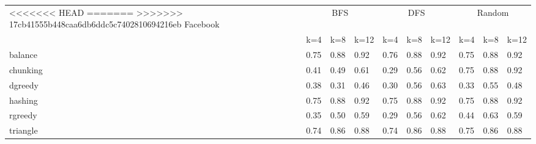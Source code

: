 \documentclass[12pt]{article}
\begin{document}
\begin{tabular}{llllllllll}
<<<<<<< HEAD
\toprule
=======
\toprule
>>>>>>> 17cb41555b448caa6db6ddc5c7402810694216eb
    Facebook & \multicolumn{3}{c}{BFS} & \multicolumn{3}{c}{DFS} & \multicolumn{3}{c}{Random}\\

    & k=4 & k=8 & k=12
    & k=4 & k=8 & k=12
     & k=4 & k=8 & k=12  \\
    \midrule
    balance &  0.75 & 0.88 	& 0.92 	& 0.76 	 &0.88 	& 0.92 	 &0.75 	& 0.88 	& 0.92       \\
chunking&	  0.41 	& 0.49 &	 0.61 &	 0.29 &	 0.56 &	 0.62 &	 0.75 &	 0.88 &	 0.92 \\
dgreedy&	  0.38 	& 0.31 &	 0.46 &	 0.30 &	 0.56 &	 0.63 &	 0.33 &	 0.55 &	 0.48  \\
hashing&	    0.75 	& 0.88 &	 0.92 &	 0.75 &	 0.88 &	 0.92 &	 0.75 &	 0.88 &	 0.92 \\
rgreedy&	    0.35 	& 0.50 &	 0.59 &	 0.29 &	 0.56 &	 0.62 &	 0.44 &	 0.63 &	 0.59 \\
triangle&	    0.74 	& 0.86 &	 0.88 &	 0.74 &	 0.86 &	 0.88 &	 0.75 &	 0.86 &	 0.88  \\
    \bottomrule
\end{tabular}
\end{document}
